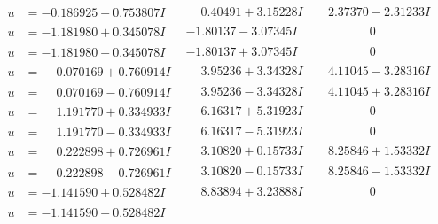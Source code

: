 \documentclass[1p]{elsarticle_modified}
\theoremstyle{definition}
\begin{document}
$$\begin{array}{c|c|c}
 \hline 
\begin{aligned}
u &= -0.186925 - 0.753807 I\end{aligned}
 & \phantom{-}0.40491 + 3.15228 I & \phantom{-}2.37370 - 2.31233 I \\ \hline\begin{aligned}
u &= -1.181980 + 0.345078 I\end{aligned}
 & -1.80137 - 3.07345 I & \phantom{-0.000000 } 0 \\ \hline\begin{aligned}
u &= -1.181980 - 0.345078 I\end{aligned}
 & -1.80137 + 3.07345 I & \phantom{-0.000000 } 0 \\ \hline\begin{aligned}
u &= \phantom{-}0.070169 + 0.760914 I\end{aligned}
 & \phantom{-}3.95236 + 3.34328 I & \phantom{-}4.11045 - 3.28316 I \\ \hline\begin{aligned}
u &= \phantom{-}0.070169 - 0.760914 I\end{aligned}
 & \phantom{-}3.95236 - 3.34328 I & \phantom{-}4.11045 + 3.28316 I \\ \hline\begin{aligned}
u &= \phantom{-}1.191770 + 0.334933 I\end{aligned}
 & \phantom{-}6.16317 + 5.31923 I & \phantom{-0.000000 } 0 \\ \hline\begin{aligned}
u &= \phantom{-}1.191770 - 0.334933 I\end{aligned}
 & \phantom{-}6.16317 - 5.31923 I & \phantom{-0.000000 } 0 \\ \hline\begin{aligned}
u &= \phantom{-}0.222898 + 0.726961 I\end{aligned}
 & \phantom{-}3.10820 + 0.15733 I & \phantom{-}8.25846 + 1.53332 I \\ \hline\begin{aligned}
u &= \phantom{-}0.222898 - 0.726961 I\end{aligned}
 & \phantom{-}3.10820 - 0.15733 I & \phantom{-}8.25846 - 1.53332 I \\ \hline\begin{aligned}
u &= -1.141590 + 0.528482 I\end{aligned}
 & \phantom{-}8.83894 + 3.23888 I & \phantom{-0.000000 } 0 \\ \hline\begin{aligned}
u &= -1.141590 - 0.528482 I\end{aligned}

\end{array}$$
\end{document}
